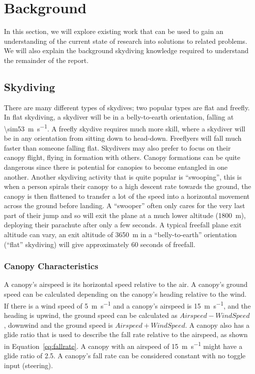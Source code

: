\section{Background}\label{sec:further-background}
In this section, we will explore existing work that can be used to gain an understanding of the current state of research into solutions to related problems. We will also explain the background skydiving knowledge required to understand the remainder of the report.



\subsection{Skydiving}
There are many different types of skydives; two popular types are flat and freefly. In flat skydiving, a skydiver will be in a belly-to-earth orientation, falling at \SI{\sim53}{\metre\per\second}. A freefly skydive requires much more skill, where a skydiver will be in any orientation from sitting down to head-down. Freeflyers will fall much faster than someone falling flat.
Skydivers may also prefer to focus on their canopy flight, flying in formation with others. Canopy formations can be quite dangerous since there is potential for canopies to become entangled in one another.
Another skydiving activity that is quite popular is ``swooping'', this is when a person spirals their canopy to a high descent rate towards the ground, the canopy is then flattened to transfer a lot of the speed into a horizontal movement across the ground before landing. A ``swooper'' often only cares for the very last part of their jump and so will exit the plane at a much lower altitude (\SI{1800}{\metre}), deploying their parachute after only a few seconds.
A typical freefall plane exit altitude can vary, an exit altitude of \SI{3650}{\metre} in a ``belly-to-earth'' orientation (``flat'' skydiving) will give approximately 60 seconds of freefall.

\subsubsection{Canopy Characteristics}
A canopy's airspeed is its horizontal speed relative to the air.  A canopy's ground speed can be calculated depending on the canopy's heading relative to the wind. If there is a wind speed of \SI{5}{\metre\per\second} and a canopy's airspeed is \SI{15}{\metre\per\second}, and the heading is upwind, the ground speed can be calculated as $Airspeed - WindSpeed$, downwind and the ground speed is $Airspeed + WindSpeed$.
A canopy also has a glide ratio that is used to describe the fall rate relative to the airspeed, as shown in Equation~\ref{eq:fallrate}. A canopy with an airspeed of \SI{15}{\metre\per\second} might have a glide ratio of 2.5. A canopy's fall rate can be considered constant with no toggle input (steering).

